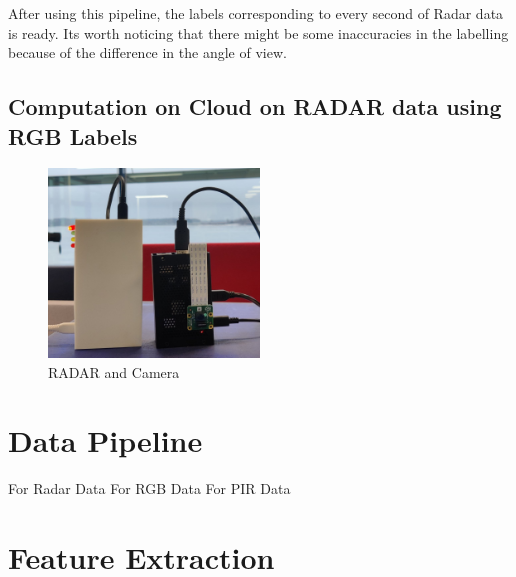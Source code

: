After using this pipeline, the labels corresponding to every second of Radar data is ready. Its worth noticing that there might be some inaccuracies in the labelling because of the difference in the angle of view. 

\subsection{Computation on Cloud on RADAR data using RGB Labels}
\begin{figure}[ht]
  \begin{center}
    \includegraphics[width=0.5\textwidth]{Master's thesis/images/equipment.jpg} 
    \caption{RADAR and Camera}
    \label{fig:AoA}
  \end{center}
\end{figure}  

\section{Data Pipeline}
\label{section:environments}
For Radar Data
For RGB Data
For PIR Data


\section{Feature Extraction}
\label{section:environments}


